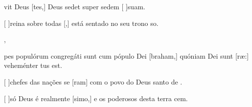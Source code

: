 {  {\item {}vit Deus [tes,] Deus sedet super sedem [ ]{su}am.~\Antiphona}%
    {\item {}[ ]{rei}na sobre todas [,] está sentado no seu trono so.~\Antiphona},
  {\item {}pes populórum congregáti sunt cum pópulo Dei [braham,] quóniam Dei sunt [\-ræ:] veheménter tus est.~\Antiphona}%
    {\item {}[ ]{che}fes das nações se [ram] com o povo do Deus santo de .~\Antiphona
      \item {}[ ]{só} Deus é realmente [simo,] e os poderosos desta terra cem.~\Antiphona}
}